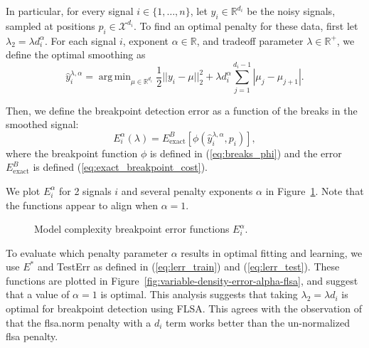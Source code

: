 \documentclass{jsfds} %
\newcommand{\fig}[3][H]{
  \begin{figure}[#1]
    \hskip -1cm
    
    \caption{#3}
    \label{fig:#2}
  \end{figure}
}
\DeclareMathOperator*{\argmin}{arg\,min}
\newcommand{\RR}{\mathbb{R}}
\begin{document}
\newpage

In particular, for every signal $i\in\{1,\dots,n\}$, let
$y_i\in\RR^{d_i}$ be the noisy signals, sampled at positions
$p_i\in\mathcal X^{d_i}$. To find an optimal penalty for these data,
first let $\lambda_2 = \lambda d_i^\alpha$. For each signal $i$,
exponent $\alpha\in\RR$, and tradeoff parameter $\lambda\in\RR^+$, we
define the optimal smoothing as
\begin{equation}
  \label{eq:flsa_lambda}
  \hat y^{\lambda,\alpha}_i = 
\argmin_{\mu\in\RR^{d_i}} 
\frac 1 2 ||y_i-\mu||_2^2
+\lambda d_i^\alpha \sum_{j=1}^{d_i-1} |\mu_j - \mu_{j+1}|.
\end{equation}

Then, we define the breakpoint detection error as a function of the
breaks in the smoothed signal:
\begin{equation}
  \label{eq:flsa_e_i_alpha}
  E_i^\alpha(\lambda) = 
E^B_{\text{exact}}
\left[
\phi\left(
\hat y^{\lambda,\alpha}_i,p_i
\right)
\right],
\end{equation}
where the breakpoint function $\phi$ is defined in
(\ref{eq:breaks_phi}) and the error $E_{\text{exact}}^B$ is defined
(\ref{eq:exact_breakpoint_cost}).

We plot $E_i^\alpha$ for 2 signals $i$ and several penalty exponents
$\alpha$ in Figure~\ref{fig:variable-density-berr-flsa}. Note that the
functions appear to align when $\alpha=1$.

\fig{variable-density-berr-flsa}{Model complexity breakpoint error
  functions $E_i^\alpha$.}

\newpage

To evaluate which penalty parameter $\alpha$ results in optimal
fitting and learning, we use $E^*$ and TestErr as defined in
(\ref{eq:lerr_train}) and (\ref{eq:lerr_test}). These functions are
plotted in Figure~\ref{fig:variable-density-error-alpha-flsa}, and
suggest that a value of $\alpha=1$ is optimal.  This analysis suggests
that taking $\lambda_2=\lambda d_i$ is optimal for breakpoint
detection using FLSA. This agrees with the observation of
\citet{HOCKING-breakpoints} that the flsa.norm penalty with a $d_i$
term works better than the un-normalized flsa penalty.
\end{document}
